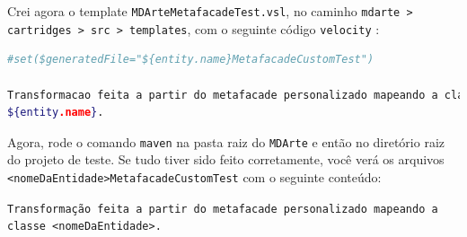 Crei agora o template \texttt{MDArteMetafacadeTest.vsl}, no caminho
\texttt{mdarte > cartridges > src > templates}, com o seguinte código
\texttt{velocity} :

\begin{lstlisting}[language=bash]
#set($generatedFile="${entity.name}MetafacadeCustomTest")

Transformacao feita a partir do metafacade personalizado mapeando a classe
${entity.name}.
\end{lstlisting}

Agora, rode o comando \texttt{maven} na pasta raiz do \texttt{MDArte} e então no
diretório raiz do projeto de teste. Se tudo tiver sido feito corretamente, você
verá os arquivos \texttt{<nomeDaEntidade>MetafacadeCustomTest} com o seguinte
conteúdo:

\texttt{Transformação feita a partir do metafacade personalizado mapeando a
classe <nomeDaEntidade>.}
